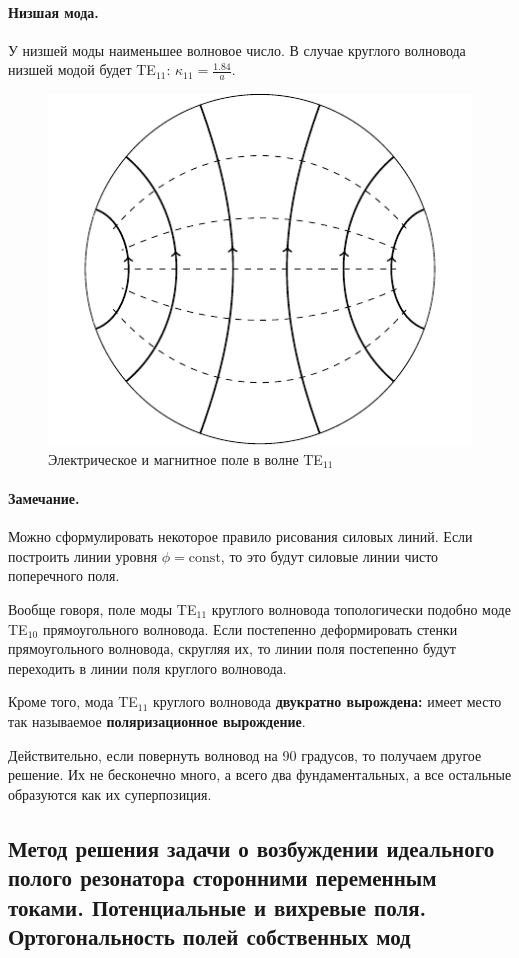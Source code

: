 \paragraph{Низшая мода.} У низшей моды наименьшее волновое число. В случае круглого волновода низшей модой будет TE$_{11}$: $\kappa_{11}=\frac{1.84}{a}$.
\begin{figure}[H]
	\centering
	\includegraphics[scale=1.4]{img_lect5/cylindric/TE11}
	\caption{Электрическое и магнитное поле в волне TE$_{11}$}
	\label{fig:cylinder:TE11}
\end{figure}
\paragraph{Замечание.} Можно сформулировать некоторое правило рисования силовых линий. Если построить линии уровня $\phi=\mathrm{const}$, то это будут силовые линии чисто поперечного поля.

Вообще говоря, поле моды TE$_{11}$ круглого волновода топологически подобно моде TE$_{10}$ прямоугольного волновода. Если постепенно деформировать стенки прямоугольного волновода, скругляя их, то линии поля постепенно будут переходить в линии поля круглого волновода.

Кроме того, мода TE$_{11}$ круглого волновода \textbf{двукратно вырождена:} имеет место так называемое \textbf{поляризационное вырождение}.
 
Действительно, если повернуть волновод на 90 градусов, то получаем другое решение. Их не бесконечно много, а всего два фундаментальных, а все остальные образуются как их суперпозиция. 

\subsection{Метод решения задачи о возбуждении идеального полого резонатора сторонними переменным токами. Потенциальные и вихревые поля. Ортогональность полей собственных мод}

